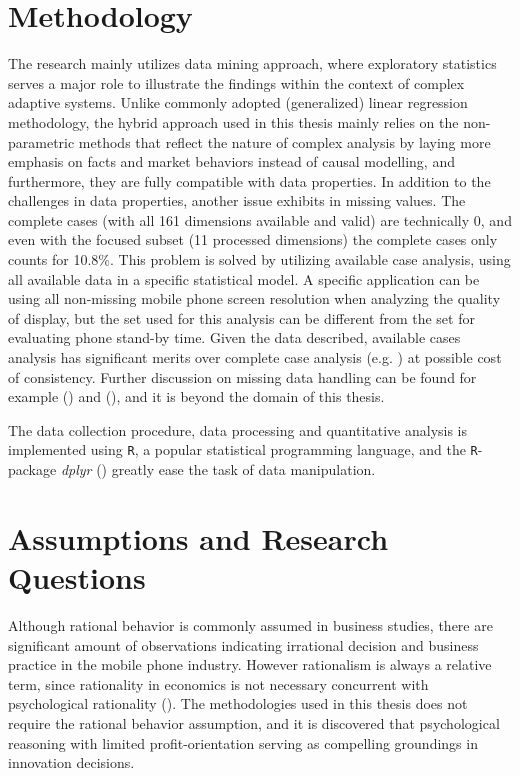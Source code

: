 \documentclass[utf8,english]{gradu3}
\begin{document}
\section{Methodology}

The research mainly utilizes data mining approach, where exploratory statistics serves a major role to illustrate the findings within the context of complex adaptive systems. Unlike commonly adopted (generalized) linear regression methodology, the hybrid approach used in this thesis mainly relies on the non-parametric methods that reflect the nature of complex analysis by laying more emphasis on facts and market behaviors instead of causal modelling, and furthermore, they are fully compatible with data properties. In addition to the challenges in data properties, another issue exhibits in missing values. The complete cases (with all 161 dimensions available and valid) are technically 0, and even with the focused subset (11 processed dimensions) the complete cases only counts for 10.8\%. This problem is solved by utilizing available case analysis, using all available data in a specific statistical model. A specific application can be using all non-missing mobile phone screen resolution when analyzing the quality of display, but the set used for this analysis can be different from the set for evaluating phone stand-by time. Given the data described, available cases analysis has significant merits over complete case analysis (e.g. \cite{kim1977treatment}) at possible cost of consistency. Further discussion on missing data handling can be found for example \citeauthor{little2014statistical} (\citeyear{little2014statistical}) and \citeauthor{pigott2001review} (\citeyear{pigott2001review}), and it is beyond the domain of this thesis.

The data collection procedure, data processing and quantitative analysis is implemented using \texttt{R}, a popular statistical programming language, and the \texttt{R}-package \textit{dplyr} (\cite{dplyr}) greatly ease the task of data manipulation.

\section{Assumptions and Research Questions}

Although rational behavior is commonly assumed in business studies, there are significant amount of observations indicating irrational decision and business practice in the mobile phone industry. However rationalism is always a relative term, since rationality in economics is not necessary concurrent with psychological rationality (\cite{hogarth1987rational}). The methodologies used in this thesis does not require the rational behavior assumption, and it is discovered that psychological reasoning with limited profit-orientation serving as compelling groundings in innovation decisions.
\end{document}
